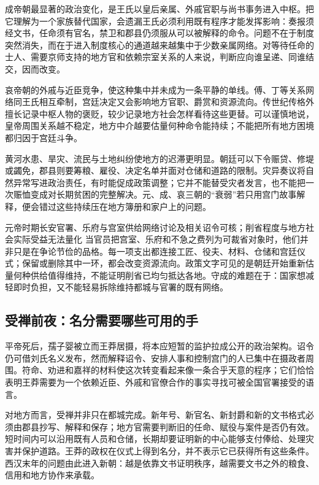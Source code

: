成帝朝最显著的政治变化，是王氏以皇后亲属、外戚官职与尚书事务进入中枢。把它理解为一个家族替代国家，会遗漏王氏必须利用既有程序才能发挥影响：奏报须经文书，任命须有官名，禁卫和郡县仍须服从可以被解释的命令。问题不在于制度突然消失，而在于进入制度核心的通道越来越集中于少数亲属网络。对等待任命的士人、需要京师支持的地方官和依赖宗室关系的人来说，判断应向谁呈递、同谁结交，因而改变。

哀帝朝的外戚与近臣竞争，使这种集中并未成为一条平静的单线。傅、丁等关系网络同王氏相互牵制，宫廷决定又会影响地方官职、爵赏和资源流向。传世纪传格外擅长记录中枢人物的褒贬，较少记录地方社会怎样看待这些更替。可以谨慎地说，皇帝周围关系越不稳定，地方中介越要估量何种命令能持续；不能把所有地方困境都归因于宫廷斗争。

黄河水患、旱灾、流民与土地纠纷使地方的迟滞更明显。朝廷可以下令赈贷、修堤或蠲免，郡县则要筹粮、雇役、决定名单并面对仓储和道路的限制。灾异奏议将自然异常写进政治责任，有时能促成政策调整；它并不能替受灾者发言，也不能把一次赈恤变成对长期贫困的完整解决。元、成、哀三朝的“衰弱”若只用宫门故事解释，便会错过这些持续压在地方簿册和家户上的问题。

\begin{event}{}{元帝时期}{长安官署、乐府与宫室供给网络}{讨论及相关诏令可核；削省程度与地方社会实际受益无法量化}
当官员把宫室、乐府和不急之费列为可裁省对象时，他们并非只是在争论节俭的品格。每一项支出都连接工匠、役夫、材料、仓储和宫廷仪式；保留或删除其中一环，都会改变资源流向。政策文字可见的是朝廷开始重新估量何种供给值得维持，不能证明削省已均匀抵达各地。守成的难题在于：国家想减轻即时负担，又不能轻易拆除维持都城与官署的既有网络。
\end{event}

\subsection{受禅前夜：名分需要哪些可用的手}

平帝死后，孺子婴被立而王莽居摄，将本应短暂的监护拉成公开的政治架构。诏令仍可借刘氏名义发布，然而解释诏令、安排人事和控制宫门的人已集中在摄政者周围。符命、劝进和嘉祥的材料使这次转变看起来像一条合乎天意的程序；它们恰恰表明王莽需要为一个依赖近臣、外戚和官僚合作的事实寻找可被全国官署接受的语言。

对地方而言，受禅并非只在都城完成。新年号、新官名、新封爵和新的文书格式必须由郡县抄写、解释和保存；地方官需要判断旧的任命、赋役与案件是否仍有效。短时间内可以沿用既有人员和仓储，长期却要证明新的中心能够支付俸给、处理灾害并保护道路。王莽的政权在仪式上得到名分，并不表示它已获得所有这些条件。西汉末年的问题由此进入新朝：越是依靠文书证明秩序，越需要文书之外的粮食、信用和地方协作来承载。

